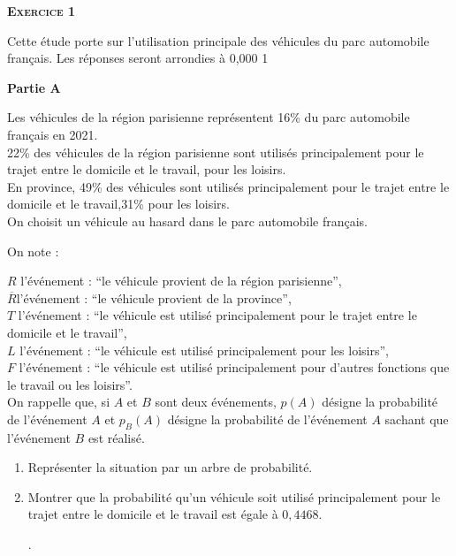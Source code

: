 \documentclass[11pt]{article}
\newcommand{\cadreblanc}[1]{%
\medskip\framebox[\linewidth][c]{%
\rule{0mm}{#1mm}}\par
\medskip}
\newcommand\Mo{\marginpar{\scalebox{.8}{\framebox[1.6ex]{\rule{0ex}{1.6ex}\raisebox{.75ex}{\rule{1.6ex}{.5pt}}}\hspace{-.3pt}\framebox[3.2ex]{Mo}}}}
\newcommand\Ca{\marginpar{\scalebox{.8}{\framebox[1.6ex]{\rule{0ex}{1.6ex}\raisebox{.75ex}{\rule{1.6ex}{.5pt}}}\hspace{-.3pt}\framebox[3.2ex]{Ca}}}}
\begin{document}
\bigskip

\noindent
\normalsize
{}

\parindent 0cm

\textbf{\textsc{Exercice 1}}

Cette étude porte sur l’utilisation principale des véhicules du parc automobile français.
Les réponses seront arrondies à 0,000 1 

\textbf{Partie A} 

Les véhicules de la région parisienne représentent 16\%  du parc automobile français en 2021.\\
22\% des véhicules de la région parisienne sont utilisés principalement pour le trajet entre le domicile et le travail,  pour les loisirs.\\
En province, 49\%  des véhicules sont utilisés principalement pour le trajet entre le domicile et le travail,31\% pour les loisirs.\\
On choisit un véhicule au hasard dans le parc automobile français.

On note :

 $R$ l’événement : “le véhicule provient de la région parisienne”,\\
  $\overline R$l’événement : “le véhicule provient de la province”,\\
 $T$ l’événement : “le véhicule est utilisé principalement pour le trajet entre le domicile et le travail”,\\
$L$ l’événement : “le véhicule est utilisé principalement pour les loisirs”,\\
$F$ l’événement : “le véhicule est utilisé principalement pour d’autres fonctions que le travail ou les loisirs”.\\

On rappelle que, si $A$  et $B$ sont deux événements, $p(A)$ désigne la probabilité de l’événement $A$ et $p_B(A)$ désigne la probabilité de l’événement $A$ sachant que l’événement $B$ est réalisé.



\begin{enumerate} 
\item Représenter la situation par un arbre de probabilité.\\
\cadreblanc{55} \Mo
\vfill
\newpage

\item Montrer que la probabilité qu'un véhicule soit utilisé principalement pour le trajet entre le domicile et le travail est égale à $0,4468$.\\[25 pt]
\begin{minipage}[c]{.91\linewidth}
    .\dotfill\\
  \end{minipage}\Ca
\end {enumerate}
\end{document}
